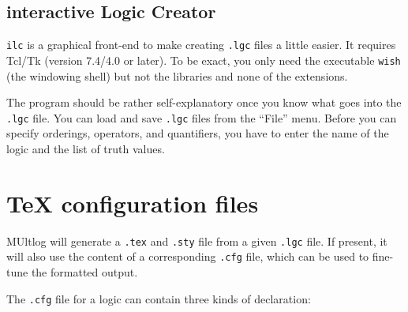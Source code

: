\documentclass[
]{article}
\newcommand{\passthrough}[1]{#1}
\begin{document}
\hypertarget{interactive-logic-creator}{%
\subsection{interactive Logic Creator}\label{interactive-logic-creator}}

\passthrough{\lstinline!ilc!} is a graphical front-end to make creating
\passthrough{\lstinline!.lgc!} files a little easier. It requires Tcl/Tk
(version 7.4/4.0 or later). To be exact, you only need the executable
\passthrough{\lstinline!wish!} (the windowing shell) but not the
libraries and none of the extensions.

The program should be rather self-explanatory once you know what goes
into the \passthrough{\lstinline!.lgc!} file. You can load and save
\passthrough{\lstinline!.lgc!} files from the ``File'' menu. Before you
can specify orderings, operators, and quantifiers, you have to enter the
name of the logic and the list of truth values.

\hypertarget{tex-configuration-files}{%
\section{TeX configuration files}\label{tex-configuration-files}}

MUltlog will generate a \passthrough{\lstinline!.tex!} and
\passthrough{\lstinline!.sty!} file from a given
\passthrough{\lstinline!.lgc!} file. If present, it will also use the
content of a corresponding \passthrough{\lstinline!.cfg!} file, which
can be used to fine-tune the formatted output.

The \passthrough{\lstinline!.cfg!} file for a logic can contain three
kinds of declaration:
\end{document}
